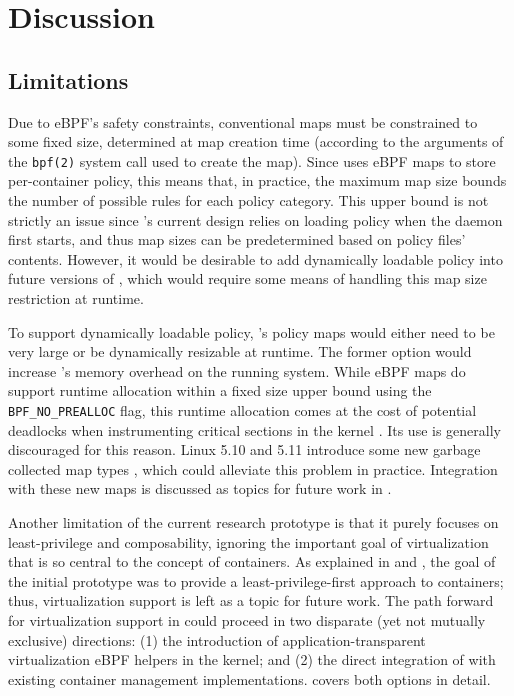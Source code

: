 \section{Discussion}


\subsection{Limitations}

Due to eBPF's safety constraints, conventional maps must be constrained to some fixed size, determined at map creation time (according to the arguments of the \texttt{bpf(2)} system call used to create the map). Since \bpfcontain{} uses eBPF maps to store per-container policy, this means that, in practice, the maximum map size bounds the number of possible rules for each policy category. This upper bound is not strictly an issue since \bpfcontain{}'s current design relies on loading policy when the daemon first starts, and thus map sizes can be predetermined based on policy files' contents. However, it would be desirable to add dynamically loadable policy into future versions of \bpfcontain{}, which would require some means of handling this map size restriction at runtime.

To support dynamically loadable policy, \bpfcontain{}'s policy maps would either need to be very large or be dynamically resizable at runtime. The former option would increase \bpfcontain{}'s memory overhead on the running system. While eBPF maps do support runtime allocation within a fixed size upper bound using the \texttt{BPF\_NO\_PREALLOC} flag, this runtime allocation comes at the cost of potential deadlocks when instrumenting critical sections in the kernel \cite{starovoitov2016_prealloc}. Its use is generally discouraged for this reason. Linux 5.10 and 5.11 introduce some new garbage collected map types \cite{singh2020_task_local_storage, singh2020_inode_local_storage}, which could alleviate this problem in practice. Integration with these new maps is discussed as topics for future work in .

Another limitation of the current research prototype is that it purely focuses on least-privilege and composability, ignoring the important goal of virtualization that is so central to the concept of containers. As explained in  and , the goal of the initial \bpfcontain{} prototype was to provide a least-privilege-first approach to containers; thus, virtualization support is left as a topic for future work. The path forward for virtualization support in \bpfcontain{} could proceed in two disparate (yet not mutually exclusive) directions: (1) the introduction of application-transparent virtualization eBPF helpers in the kernel; and (2) the direct integration of \bpfcontain{} with existing container management implementations.  covers both options in detail.

